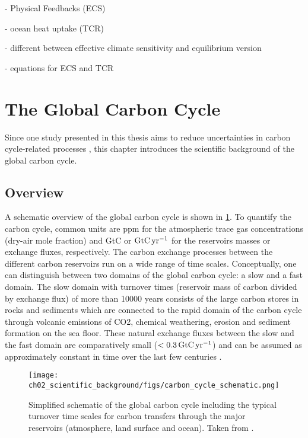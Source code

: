 - Physical Feedbacks (ECS)

- ocean heat uptake (TCR)

- different between effective climate sensitivity and equilibrium version

- equations for ECS and TCR


\section{The Global Carbon Cycle}
\label{sec:02:carbon_cycle}

Since one study presented in this thesis aims to reduce uncertainties in carbon
cycle-related processes ,
this chapter introduces the scientific background of the global carbon cycle.


\subsection{Overview}
\label{subsec:02:carbon_cycle_overview}

A schematic overview of the global carbon cycle is shown in
\cref{fig:02:carbon_cycle_schematic}. To quantify the carbon cycle, common
units are \ac{ppm} for the atmospheric trace gas concentrations (dry-air mole
fraction) and \ac{GtC} or $\si{\GtCyr{}}$ for the reservoirs masses or exchange
fluxes, respectively. The carbon exchange processes between the different
carbon reservoirs run on a wide range of time scales. Conceptually, one can
distinguish between two domains of the global carbon cycle: a slow and a fast
domain. The slow domain with turnover times (reservoir mass of carbon divided
by exchange flux) of more than 10000 years consists of the large carbon stores
in rocks and sediments which are connected to the rapid domain of the carbon
cycle through volcanic emissions of \ac{CO2}, chemical weathering, erosion and
sediment formation on the sea floor. These natural exchange fluxes between the
slow and the fast domain are comparatively small ($< 0.3 \unit{\GtCyr{}}$) and
can be assumed as approximately constant in time over the last few centuries
\autocite{Ciais2013}.

\begin{figure}[t]
  \centering
  \texttt{[image: 
    ch02\_scientific\_background/figs/carbon\_cycle\_schematic.png]}
  \caption{Simplified schematic of the global carbon cycle including the
    typical turnover time scales for carbon transfers through the major
    reservoirs (atmosphere, land surface and ocean). Taken from
    \textcite{Ciais2013}.}
  \label{fig:02:carbon_cycle_schematic}
\end{figure}

